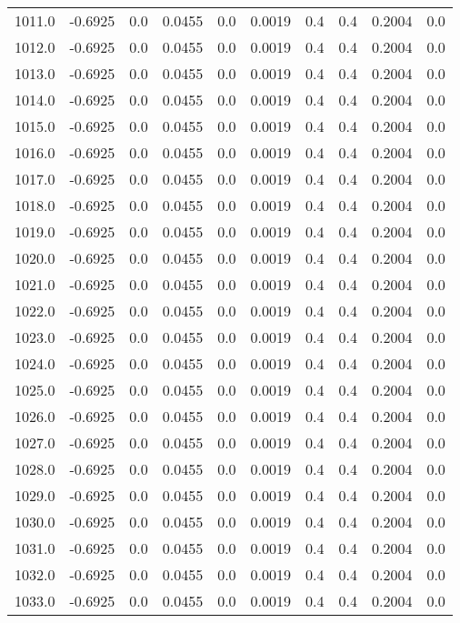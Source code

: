 \begin{longtable}{lrrrrrrrrr}
1011.0 & -0.6925 & 0.0 & 0.0455 & 0.0 & 0.0019 & 0.4 & 0.4 & 0.2004 & 0.0 \\
1012.0 & -0.6925 & 0.0 & 0.0455 & 0.0 & 0.0019 & 0.4 & 0.4 & 0.2004 & 0.0 \\
1013.0 & -0.6925 & 0.0 & 0.0455 & 0.0 & 0.0019 & 0.4 & 0.4 & 0.2004 & 0.0 \\
1014.0 & -0.6925 & 0.0 & 0.0455 & 0.0 & 0.0019 & 0.4 & 0.4 & 0.2004 & 0.0 \\
1015.0 & -0.6925 & 0.0 & 0.0455 & 0.0 & 0.0019 & 0.4 & 0.4 & 0.2004 & 0.0 \\
1016.0 & -0.6925 & 0.0 & 0.0455 & 0.0 & 0.0019 & 0.4 & 0.4 & 0.2004 & 0.0 \\
1017.0 & -0.6925 & 0.0 & 0.0455 & 0.0 & 0.0019 & 0.4 & 0.4 & 0.2004 & 0.0 \\
1018.0 & -0.6925 & 0.0 & 0.0455 & 0.0 & 0.0019 & 0.4 & 0.4 & 0.2004 & 0.0 \\
1019.0 & -0.6925 & 0.0 & 0.0455 & 0.0 & 0.0019 & 0.4 & 0.4 & 0.2004 & 0.0 \\
1020.0 & -0.6925 & 0.0 & 0.0455 & 0.0 & 0.0019 & 0.4 & 0.4 & 0.2004 & 0.0 \\
1021.0 & -0.6925 & 0.0 & 0.0455 & 0.0 & 0.0019 & 0.4 & 0.4 & 0.2004 & 0.0 \\
1022.0 & -0.6925 & 0.0 & 0.0455 & 0.0 & 0.0019 & 0.4 & 0.4 & 0.2004 & 0.0 \\
1023.0 & -0.6925 & 0.0 & 0.0455 & 0.0 & 0.0019 & 0.4 & 0.4 & 0.2004 & 0.0 \\
1024.0 & -0.6925 & 0.0 & 0.0455 & 0.0 & 0.0019 & 0.4 & 0.4 & 0.2004 & 0.0 \\
1025.0 & -0.6925 & 0.0 & 0.0455 & 0.0 & 0.0019 & 0.4 & 0.4 & 0.2004 & 0.0 \\
1026.0 & -0.6925 & 0.0 & 0.0455 & 0.0 & 0.0019 & 0.4 & 0.4 & 0.2004 & 0.0 \\
1027.0 & -0.6925 & 0.0 & 0.0455 & 0.0 & 0.0019 & 0.4 & 0.4 & 0.2004 & 0.0 \\
1028.0 & -0.6925 & 0.0 & 0.0455 & 0.0 & 0.0019 & 0.4 & 0.4 & 0.2004 & 0.0 \\
1029.0 & -0.6925 & 0.0 & 0.0455 & 0.0 & 0.0019 & 0.4 & 0.4 & 0.2004 & 0.0 \\
1030.0 & -0.6925 & 0.0 & 0.0455 & 0.0 & 0.0019 & 0.4 & 0.4 & 0.2004 & 0.0 \\
1031.0 & -0.6925 & 0.0 & 0.0455 & 0.0 & 0.0019 & 0.4 & 0.4 & 0.2004 & 0.0 \\
1032.0 & -0.6925 & 0.0 & 0.0455 & 0.0 & 0.0019 & 0.4 & 0.4 & 0.2004 & 0.0 \\
1033.0 & -0.6925 & 0.0 & 0.0455 & 0.0 & 0.0019 & 0.4 & 0.4 & 0.2004 & 0.0 \\

\end{longtable}
